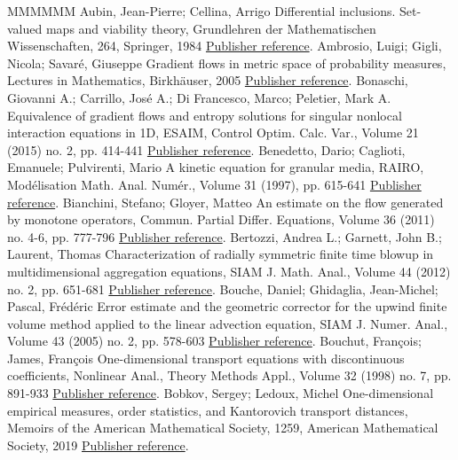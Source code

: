 \documentclass[11pt]{article}
\theoremstyle{definition}
\numberwithin{equation}{section}
\begin{document}
\begin{thebibliography}{MMMMMM}
 Aubin, Jean-Pierre; Cellina, Arrigo Differential inclusions. Set-valued maps and viability theory, Grundlehren der Mathematischen Wissenschaften, 264, Springer, 1984 \href{https://ahl.centre-mersenne.org/item/AHL_2020__3__217_0/#AubinCellina}{Publisher reference}.
 Ambrosio, Luigi; Gigli, Nicola; Savaré, Giuseppe Gradient flows in metric space of probability measures, Lectures in Mathematics, Birkhäuser, 2005 \href{https://ahl.centre-mersenne.org/item/AHL_2020__3__217_0/#Ambrosio}{Publisher reference}.
 Bonaschi, Giovanni A.; Carrillo, José A.; Di Francesco, Marco; Peletier, Mark A. Equivalence of gradient flows and entropy solutions for singular nonlocal interaction equations in 1D, ESAIM, Control Optim. Calc. Var., Volume 21 (2015) no. 2, pp. 414-441 \href{https://ahl.centre-mersenne.org/item/AHL_2020__3__217_0/#bonaschi}{Publisher reference}.
 Benedetto, Dario; Caglioti, Emanuele; Pulvirenti, Mario A kinetic equation for granular media, RAIRO, Modélisation Math. Anal. Numér., Volume 31 (1997), pp. 615-641 \href{https://ahl.centre-mersenne.org/item/AHL_2020__3__217_0/#benedetto}{Publisher reference}.
 Bianchini, Stefano; Gloyer, Matteo An estimate on the flow generated by monotone operators, Commun. Partial Differ. Equations, Volume 36 (2011) no. 4-6, pp. 777-796 \href{https://ahl.centre-mersenne.org/item/AHL_2020__3__217_0/#Bianchini}{Publisher reference}.
 Bertozzi, Andrea L.; Garnett, John B.; Laurent, Thomas Characterization of radially symmetric finite time blowup in multidimensional aggregation equations, SIAM J. Math. Anal., Volume 44 (2012) no. 2, pp. 651-681 \href{https://ahl.centre-mersenne.org/item/AHL_2020__3__217_0/#Andrea_c_toaa}{Publisher reference}.
 Bouche, Daniel; Ghidaglia, Jean-Michel; Pascal, Frédéric Error estimate and the geometric corrector for the upwind finite volume method applied to the linear advection equation, SIAM J. Numer. Anal., Volume 43 (2005) no. 2, pp. 578-603 \href{https://ahl.centre-mersenne.org/item/AHL_2020__3__217_0/#bouche}{Publisher reference}.
 Bouchut, François; James, François One-dimensional transport equations with discontinuous coefficients, Nonlinear Anal., Theory Methods Appl., Volume 32 (1998) no. 7, pp. 891-933 \href{https://ahl.centre-mersenne.org/item/AHL_2020__3__217_0/#bj1}{Publisher reference}.
 Bobkov, Sergey; Ledoux, Michel One-dimensional empirical measures, order statistics, and Kantorovich transport distances, Memoirs of the American Mathematical Society, 1259, American Mathematical Society, 2019 \href{https://ahl.centre-mersenne.org/item/AHL_2020__3__217_0/#bobkov:ledoux}{Publisher reference}.

\end{thebibliography}
\end{document}
